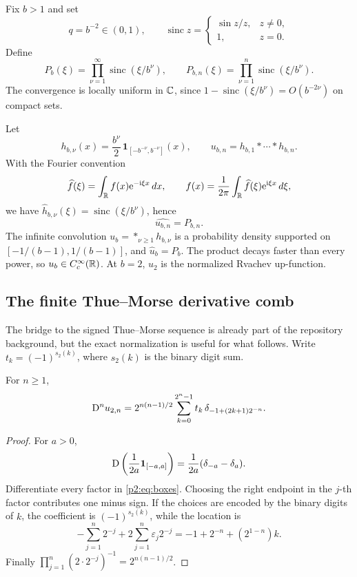 \documentclass[11pt,oneside]{article}
\numberwithin{equation}{section}
\theoremstyle{definition}
\theoremstyle{remark}
\newcommand{\sinc}{\operatorname{sinc}}
\begin{document}
Fix \(b>1\) and set
\[
 q=b^{-2}\in(0,1),\qquad \sinc z=\begin{cases}\sin z/z,&z\ne0,\\1,&z=0.\end{cases}
\]
Define
\begin{equation}
 P_b(\xi)=\prod_{\nu=1}^{\infty}\sinc(\xi/b^\nu),
 \qquad
 P_{b,n}(\xi)=\prod_{\nu=1}^{n}\sinc(\xi/b^\nu).
 \label{p2:eq:products}
\end{equation}
The convergence is locally uniform in \(\mathbb{C}\), since
\(1-\sinc(\xi/b^\nu)=O(b^{-2\nu})\) on compact sets.

Let
\begin{equation}
 h_{b,\nu}(x)=\frac{b^\nu}{2}\,\mathbf 1_{[-b^{-\nu},b^{-\nu}]}(x),
 \qquad
 u_{b,n}=h_{b,1}*\cdots*h_{b,n}.
 \label{p2:eq:boxes}
\end{equation}
With the Fourier convention
\[
 \widehat f(\xi)=\int_{\mathbb{R}}f(x)\mathrm{e}^{-\mathrm{i}\xi x}\,dx,
 \qquad
 f(x)=\frac1{2\pi}\int_{\mathbb{R}}\widehat f(\xi)\mathrm{e}^{\mathrm{i}\xi x}\,d\xi,
\]
we have \(\widehat h_{b,\nu}(\xi)=\sinc(\xi/b^\nu)\), hence
\begin{equation}
 \widehat{u_{b,n}}=P_{b,n}.
 \label{p2:eq:finiteFT}
\end{equation}
The infinite convolution \(u_b=*_{\nu\geq1}h_{b,\nu}\) is a probability density
supported on \([-1/(b-1),1/(b-1)]\), and \(\widehat u_b=P_b\). The product
decays faster than every power, so \(u_b\in C_c^\infty(\mathbb{R})\). At \(b=2\),
\(u_2\) is the normalized Rvachev up-function.

\subsection{The finite Thue--Morse derivative comb}

The bridge to the signed Thue--Morse sequence is already part of the repository
background, but the exact normalization is useful for what follows. Write
\(t_k=(-1)^{s_2(k)}\), where \(s_2(k)\) is the binary digit sum.

\begin{proposition}
For \(n\geq1\),
\begin{equation}
 \mathrm{D}^n u_{2,n}
 =2^{n(n-1)/2}\sum_{k=0}^{2^n-1}t_k\,
 \delta_{-1+(2k+1)2^{-n}}.
 \label{p2:eq:TMcomb}
\end{equation}
\end{proposition}

\begin{proof}
For \(a>0\),
\[
 \mathrm{D}\left(\frac1{2a}\mathbf1_{[-a,a]}\right)
 =\frac1{2a}(\delta_{-a}-\delta_a).
\]
Differentiate every factor in \eqref{p2:eq:boxes}. Choosing the right endpoint in
the \(j\)-th factor contributes one minus sign. If the choices are encoded by
the binary digits of \(k\), the coefficient is \((-1)^{s_2(k)}\), while the
location is
\[
 -\sum_{j=1}^n2^{-j}+2\sum_{j=1}^n\varepsilon_j2^{-j}
 =-1+2^{-n}+(2^{1-n})k.
\]
Finally \(\prod_{j=1}^n(2\cdot2^{-j})^{-1}=2^{n(n-1)/2}\).
\end{proof}
\end{document}
